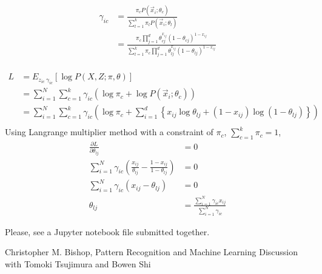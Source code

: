 \documentclass{introtosml}
\newcommand{\x}{\vec{x}}
\newcommand\pinb[1]{\pi_c \prod_{j=1}^d \theta_{#1 j}^{x_{ij}} (1 - \theta_{#1 j})^{1 - x_{ij}}}
\begin{document}
\begin{p}
  \item
    \begin{align*}
      \gamma_{ic}
      & = \frac{\pi_c P(\x_i; \theta_c)}{\sum_{l=1}^k \pi_l P(\x_i; \theta_l)} \\
      & = \frac{\pinb{c}}{\sum_{l=1}^k \pinb{l}} \\
    \end{align*}

  \item
    \begin{align*}
      L
      & = E_{z_{ic} ~ \gamma_{ic}} \left[ \log P(X, Z; \pi, \theta) \right] \\
      & = \sum_{i=1}^N \sum_{c=1}^k \gamma_{ic} (\log \pi_c + \log P(\x_i; \theta_c)) \\
      & = \sum_{i=1}^N \sum_{c=1}^k \gamma_{ic} (\log \pi_c + \sum_{i=1}^d
          \left\{ x_{ij} \log \theta_{lj} + (1 - x_{ij}) \log (1 - \theta_{lj}) \right\}) \\
    \end{align*}
    Using Langrange multiplier method with a constraint of $\pi_c$, $\sum_{c=1}^k \pi_c = 1$,
    \begin{align*}
      \frac{\partial L}{\partial \theta_{lj}} & = 0 \\
      \sum_{i=1}^N \gamma_{ic} (\frac{x_{ij}}{\theta_{lj}} - \frac{1 - x_{ij}}{1 - \theta_{lj}}) & = 0 \\
      \sum_{i=1}^N \gamma_{ic} (x_{ij} - \theta_{lj}) & = 0 \\
      \theta_{lj} & = \frac{\sum_{i=1}^N \gamma_{ic} x_{ij}}{\sum_{i=1}^N \gamma_{ic}}
    \end{align*}

  \item
    Please, see a Jupyter notebook file submitted together.
\end{p}

\begin{thebibliography}{9}
   Christopher M. Bishop, Pattern Recognition and Machine Learning
   Discussion with Tomoki Tsujimura and Bowen Shi
\end{thebibliography}
\end{document}
